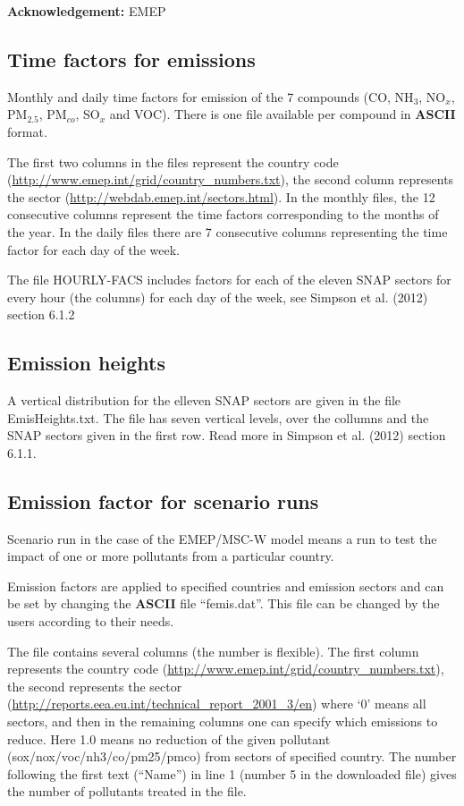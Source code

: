 \documentclass[a4paper,12pt]{report}
\newcommand{\COMMENT}[1]{{\color{magenta}{#1}}}
\begin{document}
{\bf Acknowledgement:} EMEP

\subsection{Time factors for emissions}

Monthly and daily time factors for emission of the 7 compounds 
(CO, NH$_{3}$, NO$_{x}$, PM$_{2.5}$, PM$_{co}$, SO$_{x}$ and VOC). 
There is one file available per compound in {\bf ASCII} format. 

The first two columns in the files represent the country code \\
(\url{http://www.emep.int/grid/country_numbers.txt}), the second column 
represents the sector (\url{http://webdab.emep.int/sectors.html}). In the monthly files, 
the 12 consecutive columns represent the time factors corresponding to 
the months of the year. In the daily files there are 7 consecutive columns representing 
the time factor for each day of the week. 

The file HOURLY-FACS 
includes factors for each of the eleven SNAP sectors for every hour (the columns) for 
each day of the week, see Simpson et al. (2012) section 6.1.2


\subsection{Emission heights}
A vertical distribution for the elleven SNAP sectors are given in the file EmisHeights.txt. 
The file has seven vertical levels, over the collumns and the SNAP sectors given in the first row. 
Read more in Simpson et al. (2012) section 6.1.1.

\subsection{Emission factor for scenario runs}\label{sec:femis}
Scenario run in the case of the EMEP/MSC-W model means a run to test
the impact of one or more pollutants from a particular
country. 

Emission factors are applied to specified countries and
emission sectors and can be set by changing the {\bf ASCII} file
``femis.dat''. 
This file can be changed by the users according to their needs.

The file contains several columns (the number is flexible). The first column represents
the country code (\url{http://www.emep.int/grid/country_numbers.txt}),
the second represents the sector
(\url{http://reports.eea.eu.int/technical_report_2001_3/en}) 
where `0' means all sectors, and then in the remaining
 columns one can specify
which emissions to reduce. Here 1.0 means no reduction of the given
pollutant 
(sox/nox/voc/nh3/co/pm25/pmco) from sectors of specified country. The
number following the first text (``Name'') in line 1 (number 5 in
the downloaded file) gives the number of pollutants treated in the file.
\end{document}
